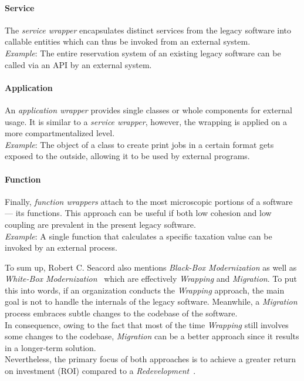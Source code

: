 \documentclass[12pt,a4paper,twoside]{report}
\begin{document}
\paragraph{Service}
The \textit{service wrapper} encapsulates distinct services from the legacy software
into callable entities which can thus be invoked from an external system.\\
\textit{Example}: The entire reservation system of an existing legacy software
can be called via an API by an external system.

\paragraph{Application}
An \textit{application wrapper} provides single classes or whole components for external usage.
It is similar to a \textit{service wrapper}, however, the wrapping is applied on a more
compartmentalized level.\\
\textit{Example}: The object of a class to create print jobs in a certain format
gets exposed to the outside, allowing it to be used by external programs.

\paragraph{Function}
Finally, \textit{function wrappers} attach to the most microscopic portions of a software ---
its functions. This approach can be useful if both low cohesion and low coupling are prevalent
in the present legacy software.\\
\textit{Example}: A single function that calculates a specific taxation value
can be invoked by an external process.
\newline

To sum up, Robert C. Seacord also mentions \textit{Black-Box Modernization} as well as
\textit{White-Box Modernization}~\cite{seacord-modernizing-legacy} which are
effectively \textit{Wrapping} and \textit{Migration}. To put this into words,
if an organization conducts the \textit{Wrapping} approach, the main goal is not
to handle the internals of the legacy software.
Meanwhile, a \textit{Migration} process embraces subtle changes to the codebase of the software.\\
In consequence, owing to the fact that most of the time \textit{Wrapping} still
involves some changes to the codebase, \textit{Migration} can be a better
approach since it results in a longer-term solution.\\
Nevertheless, the primary focus of both approaches is to achieve a greater
return on investment (ROI) compared to a \textit{Redevelopment}~\cite{tilley-perspectives-reengineering}.
\end{document}
